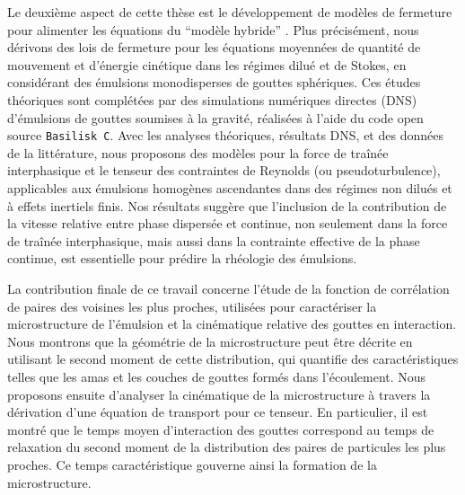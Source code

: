 Le deuxi\`eme aspect de cette th\`ese est le d\'eveloppement de mod\`eles de fermeture pour alimenter les \'equations du  ``mod\`ele hybride'' .
Plus pr\'ecis\'ement, nous d\'erivons des lois de fermeture pour les \'equations moyenn\'ees de quantit\'e de mouvement et d'\'energie cin\'etique dans les r\'egimes dilu\'e et de Stokes, en consid\'erant des \'emulsions monodisperses de gouttes sph\'eriques.
Ces \'etudes th\'eoriques sont compl\'et\'ees par des simulations num\'eriques directes (DNS) d'\'emulsions de gouttes soumises \`a la gravit\'e, r\'ealis\'ees \`a l'aide du code open source \texttt{Basilisk C}.
Avec les analyses th\'eoriques, r\'esultats DNS, et des donn\'ees de la litt\'erature, nous proposons des mod\`eles pour la force de tra\^in\'ee interphasique et le tenseur des contraintes de Reynolds (ou pseudoturbulence), applicables aux \'emulsions homog\`enes ascendantes dans des r\'egimes non dilu\'es et \`a effets inertiels finis.
Nos r\'esultats sugg\`ere que l'inclusion de la contribution de la vitesse relative entre phase dispers\'ee et continue, non seulement dans la force de tra\^in\'ee interphasique, mais aussi dans la contrainte effective de la phase continue, est essentielle pour pr\'edire la rh\'eologie des \'emulsions.

La contribution finale de ce travail concerne l'\'etude de la fonction de corr\'elation de paires des voisines les plus proches, utilis\'ees pour caract\'eriser la microstructure de l'\'emulsion et la cin\'ematique relative des gouttes en interaction.
Nous montrons que la g\'eom\'etrie de la microstructure peut \^etre d\'ecrite en utilisant le second moment de cette distribution, qui quantifie des caract\'eristiques telles que les amas et les couches de gouttes form\'es dans l'\'ecoulement.
Nous proposons ensuite d'analyser la cin\'ematique de la microstructure \`a travers la d\'erivation d'une \'equation de transport pour ce tenseur.
En particulier, il est montr\'e que le temps moyen d'interaction des gouttes correspond au temps de relaxation du second moment de la distribution des paires de particules les plus proches.
Ce temps caract\'eristique gouverne ainsi la formation de la microstructure.
